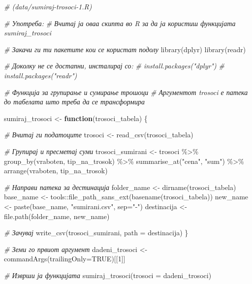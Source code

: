 \documentclass[
]{book}
\newenvironment{Shaded}{\begin{snugshade}}{\end{snugshade}}
\newcommand{\AttributeTok}[1]{\textcolor[rgb]{0.77,0.63,0.00}{#1}}
\newcommand{\CommentTok}[1]{\textcolor[rgb]{0.56,0.35,0.01}{\textit{#1}}}
\newcommand{\ConstantTok}[1]{\textcolor[rgb]{0.00,0.00,0.00}{#1}}
\newcommand{\ControlFlowTok}[1]{\textcolor[rgb]{0.13,0.29,0.53}{\textbf{#1}}}
\newcommand{\DecValTok}[1]{\textcolor[rgb]{0.00,0.00,0.81}{#1}}
\newcommand{\FunctionTok}[1]{\textcolor[rgb]{0.00,0.00,0.00}{#1}}
\newcommand{\NormalTok}[1]{#1}
\newcommand{\OtherTok}[1]{\textcolor[rgb]{0.56,0.35,0.01}{#1}}
\newcommand{\SpecialCharTok}[1]{\textcolor[rgb]{0.00,0.00,0.00}{#1}}
\newcommand{\StringTok}[1]{\textcolor[rgb]{0.31,0.60,0.02}{#1}}
\begin{document}
\begin{Shaded}
\begin{Highlighting}[]
\CommentTok{\# (data/sumiraj{-}trosoci{-}1.R)}

\CommentTok{\# Употреба:}
\CommentTok{\# Вчитај ја оваа скипта во R за да ја користиш функцијата \textasciigrave{}sumiraj\_trosoci\textasciigrave{}  }

\CommentTok{\# Закачи ги ти пакетите кои се користат подолу }
\FunctionTok{library}\NormalTok{(dplyr)}
\FunctionTok{library}\NormalTok{(readr)}

\CommentTok{\# Доколку не се достапни, инсталирај со:}
\CommentTok{\# install.packages("dplyr")}
\CommentTok{\# install.packages("readr")}

\CommentTok{\# Функција за групирање и сумирање трошоци}
\CommentTok{\# Аргументот \textasciigrave{}trosoci\textasciigrave{} е патека до табелата што треба да се трансформира}

\NormalTok{sumiraj\_trosoci }\OtherTok{\textless{}{-}} \ControlFlowTok{function}\NormalTok{(trosoci\_tabela) \{}
  
  \CommentTok{\# Вчитај ги податоците}
\NormalTok{  trosoci }\OtherTok{\textless{}{-}} \FunctionTok{read\_csv}\NormalTok{(trosoci\_tabela)}
  
  \CommentTok{\# Групирај и пресметај суми}
\NormalTok{  trosoci\_sumirani }\OtherTok{\textless{}{-}}\NormalTok{ trosoci }\SpecialCharTok{\%\textgreater{}\%}
    \FunctionTok{group\_by}\NormalTok{(vraboten, tip\_na\_trosok) }\SpecialCharTok{\%\textgreater{}\%}
    \FunctionTok{summarise\_at}\NormalTok{(}\StringTok{"cena"}\NormalTok{, }\StringTok{"sum"}\NormalTok{) }\SpecialCharTok{\%\textgreater{}\%} 
  \FunctionTok{arrange}\NormalTok{(vraboten, tip\_na\_trosok)}
  
  \CommentTok{\# Направи патека за дестинација}
\NormalTok{  folder\_name }\OtherTok{\textless{}{-}} \FunctionTok{dirname}\NormalTok{(trosoci\_tabela)}
\NormalTok{  base\_name }\OtherTok{\textless{}{-}}\NormalTok{ tools}\SpecialCharTok{::}\FunctionTok{file\_path\_sans\_ext}\NormalTok{(}\FunctionTok{basename}\NormalTok{(trosoci\_tabela))}
\NormalTok{  new\_name }\OtherTok{\textless{}{-}} \FunctionTok{paste}\NormalTok{(base\_name, }\StringTok{"sumirani.csv"}\NormalTok{, }\AttributeTok{sep=}\StringTok{"{-}"}\NormalTok{)}
\NormalTok{  destinacija }\OtherTok{\textless{}{-}} \FunctionTok{file.path}\NormalTok{(folder\_name, new\_name)}
  
  \CommentTok{\# Зачувај}
  \FunctionTok{write\_csv}\NormalTok{(trosoci\_sumirani, }\AttributeTok{path =}\NormalTok{ destinacija)}
\NormalTok{\}}

\CommentTok{\# Земи го првиот аргумент}
\NormalTok{dadeni\_trosoci }\OtherTok{\textless{}{-}} \FunctionTok{commandArgs}\NormalTok{(}\AttributeTok{trailingOnly=}\ConstantTok{TRUE}\NormalTok{)[[}\DecValTok{1}\NormalTok{]]}

\CommentTok{\# Изврши ја функцијата}
\FunctionTok{sumiraj\_trosoci}\NormalTok{(}\AttributeTok{trosoci =}\NormalTok{ dadeni\_trosoci)}
\end{Highlighting}
\end{Shaded}
\end{document}
